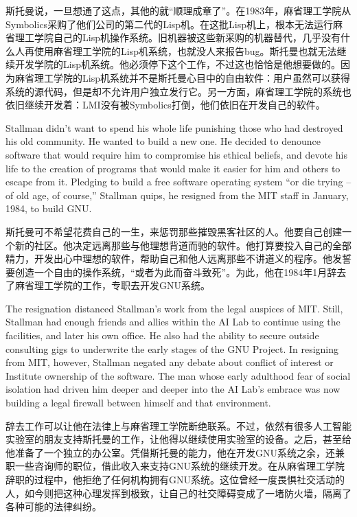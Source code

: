 \ifdefined\chs
斯托曼说，一旦想通了这点，其他的就``顺理成章了''。在1983年，麻省理工学院从Symbolics采购了他们公司的第二代的Lisp机。在这批Lisp机上，根本无法运行麻省理工学院自己的Lisp机操作系统。旧机器被这些新采购的机器替代，几乎没有什么人再使用麻省理工学院的Lisp机系统，也就没人来报告bug。斯托曼也就无法继续开发学院的Lisp机系统。他必须停下这个工作，不过这也恰恰是他想要做的。因为麻省理工学院的Lisp机系统并不是斯托曼心目中的自由软件：用户虽然可以获得系统的源代码，但是却不允许用户独立发行它。另一方面，麻省理工学院的系统也依旧继续开发着：LMI没有被Symbolics打倒，他们依旧在开发自己的软件。
\fi

\ifdefined\eng
Stallman didn't want to spend his whole life punishing those who had destroyed his old community.  He wanted to build a new one. He decided to denounce software that would require him to compromise his ethical beliefs, and devote his life to the creation of programs that would make it easier for him and others to escape from it. Pledging to build a free software operating system ``or die trying -- of old age, of course,'' Stallman quips, he resigned from the MIT staff in January, 1984, to build GNU.
\fi

\ifdefined\chs
斯托曼可不希望花费自己的一生，来惩罚那些摧毁黑客社区的人。他要自己创建一个新的社区。他决定远离那些与他理想背道而驰的软件。他打算要投入自己的全部精力，开发出心中理想的软件，帮助自己和他人远离那些不讲道义的程序。他发誓要创造一个自由的操作系统，``或者为此而奋斗致死''。为此，他在1984年1月辞去了麻省理工学院的工作，专职去开发GNU系统。
\fi

\ifdefined\eng
The resignation distanced Stallman's work from the legal auspices of MIT. Still, Stallman had enough friends and allies within the AI Lab to continue using the facilities, and later his own office. He also had the ability to secure outside consulting gigs to underwrite the early stages of the GNU Project. In resigning from MIT, however, Stallman negated any debate about conflict of interest or Institute ownership of the software. The man whose early adulthood fear of social isolation had driven him deeper and deeper into the AI Lab's embrace was now building a legal firewall between himself and that environment.
\fi

\ifdefined\chs
辞去工作可以让他在法律上与麻省理工学院断绝联系。不过，依然有很多人工智能实验室的朋友支持斯托曼的工作，让他得以继续使用实验室的设备。之后，甚至给他准备了一个独立的办公室。凭借斯托曼的能力，他在开发GNU系统之余，还兼职一些咨询师的职位，借此收入来支持GNU系统的继续开发。在从麻省理工学院辞职的过程中，他拒绝了任何机构拥有GNU系统。这位曾经一度畏惧社交活动的人，如今则把这种心理发挥到极致，让自己的社交障碍变成了一堵防火墙，隔离了各种可能的法律纠纷。
\fi

